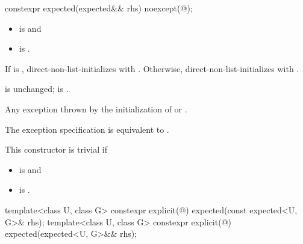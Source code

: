 %
\begin{itemdecl}
constexpr expected(expected&& rhs) noexcept(@\seebelow@);
\end{itemdecl}

\begin{itemdescr}
\pnum
\constraints
\begin{itemize}
\item
{} is  and
\item
{} is .
\end{itemize}

\pnum
\effects
If  is ,
direct-non-list-initializes  with .
Otherwise,
direct-non-list-initializes  with .

\pnum
\ensures
{} is unchanged;
 is .

\pnum
\throws
Any exception thrown by the initialization of  or .

\pnum
\remarks
The exception specification is equivalent to
.

\pnum
This constructor is trivial if
\begin{itemize}
\item
{} is  and
\item
{} is .
\end{itemize}
\end{itemdescr}

%
\begin{itemdecl}
template<class U, class G>
  constexpr explicit(@\seebelow@) expected(const expected<U, G>& rhs);
template<class U, class G>
  constexpr explicit(@\seebelow@) expected(expected<U, G>&& rhs);
\end{itemdecl}

